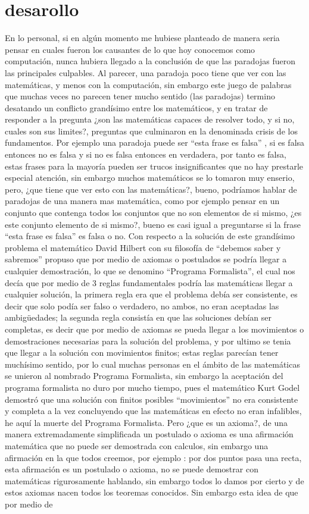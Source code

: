 \documentclass{article}
\begin{document}
\section{desarollo}
En lo personal, si en algún momento me hubiese planteado de manera seria pensar en cuales fueron los causantes de lo que hoy conocemos como computación, nunca hubiera llegado a la conclusión de que las paradojas fueron las principales culpables. Al parecer, una paradoja poco tiene que ver con  las matemáticas, y menos con la computación, sin embargo este juego de palabras que muchas veces no parecen tener mucho sentido (las paradojas) termino desatando un conflicto grandísimo entre los matemáticos, y en tratar de responder a la pregunta ¿son las matemáticas capaces de resolver todo, y si no, cuales son sus limites?, preguntas que culminaron en la denominada crisis de los fundamentos. Por ejemplo una paradoja puede ser “esta frase es falsa” , si es falsa entonces no es falsa y si no es falsa entonces en verdadera, por tanto es falsa, estas frases para la mayoría pueden ser trucos insignificantes que no hay prestarle especial atención, sin embargo muchos matemáticos se lo tomaron muy enserio, pero, ¿que tiene que ver esto con las matemáticas?, bueno, podríamos hablar de paradojas de una manera mas matemática, como por ejemplo pensar en un conjunto que contenga todos los conjuntos que no son elementos de si mismo, ¿es este conjunto elemento de si mismo?, bueno es casi igual a preguntarse si la frase “esta frase es falsa” es falsa o no. Con respecto a la solución de este grandísimo problema el matemático David Hilbert con su filosofía de “debemos saber y sabremos” propuso que por medio de axiomas o postulados se podría llegar a cualquier demostración, lo que se denomino “Programa Formalista”, el cual nos decía que por medio de 3 reglas fundamentales podría las matemáticas llegar a cualquier solución, la primera regla era que el problema debía ser consistente, es decir que solo podía ser falso o verdadero, no ambos, no eran aceptadas las ambigüedades; la segunda regla consistía en que las soluciones debían ser completas, es decir que por medio de axiomas se pueda llegar a los movimientos o demostraciones necesarias para la solución del problema, y por ultimo se tenia que llegar a la solución con movimientos finitos; estas reglas parecían tener muchísimo sentido, por lo cual muchas personas en el ámbito de las matemáticas se unieron al nombrado Programa Formalista, sin embargo la aceptación del programa formalista no duro por mucho tiempo, pues el matemático Kurt Godel demostró que una solución con finitos posibles “movimientos” no era consistente y completa a la vez concluyendo que las matemáticas en efecto no eran infalibles, he aquí la muerte del Programa Formalista. Pero ¿que es un axioma?, de una manera extremadamente simplificada un postulado o axioma es una afirmación matemática que no puede ser demostrada con calculos, sin embargo una afirmación en la que todos creemos, por ejemplo : por dos puntos pasa una recta, esta afirmación es un postulado o axioma, no se puede demostrar con matemáticas rigurosamente hablando, sin embargo todos lo damos por cierto y de estos axiomas nacen todos los teoremas conocidos. Sin embargo esta idea de que por medio de 
\end{document}
